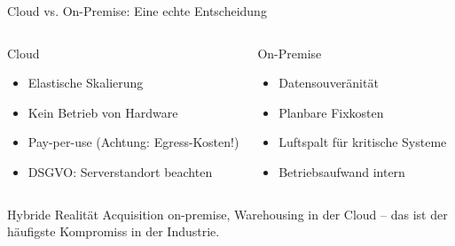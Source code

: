\documentclass[aspectratio=169]{beamer}
\begin{document}
\begin{frame}{Cloud vs. On-Premise: Eine echte Entscheidung}
  \begin{columns}
      \begin{block}{Cloud}
        \begin{itemize}
          \item Elastische Skalierung
          \item Kein Betrieb von Hardware
          \item Pay-per-use (Achtung: Egress-Kosten!)
          \item DSGVO: Serverstandort beachten
        \end{itemize}
      \end{block}
      \begin{block}{On-Premise}
        \begin{itemize}
          \item Datensouveränität
          \item Planbare Fixkosten
          \item Luftspalt für kritische Systeme
          \item Betriebsaufwand intern
        \end{itemize}
      \end{block}
  \end{columns}
  \vspace{0.5em}
  \begin{alertblock}{Hybride Realität}
    Acquisition on-premise, Warehousing in der Cloud – das ist der häufigste
    Kompromiss in der Industrie.
  \end{alertblock}
\end{frame}
\end{document}
